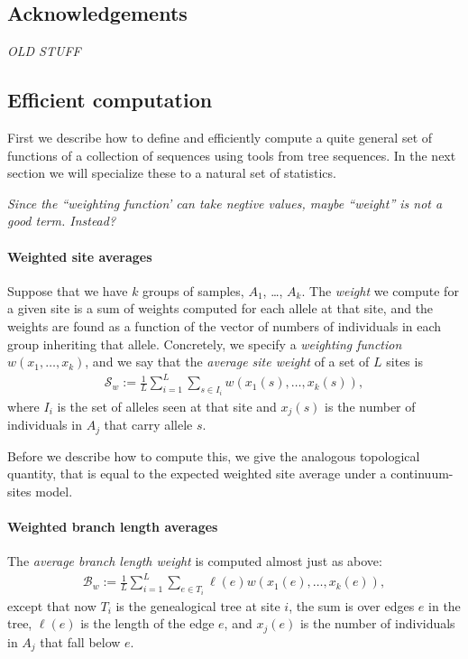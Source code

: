 \documentclass{article}
\newcommand{\branch}{\mathcal{B}} %
\newcommand{\site}{\mathcal{S}} %
\newcommand{\plr}[1]{{\color{blue} \it #1}}
\begin{document}
\subsection*{Acknowledgements}




\newpage
\appendix

{\Large \plr{OLD STUFF}}

\subsection*{Efficient computation}

First we describe how to define
and efficiently compute a quite general set of functions of a collection of sequences
using tools from tree sequences.
In the next section we will specialize these to a natural set of statistics.

\plr{Since the ``weighting function' can take negtive values, maybe ``weight'' is not a good term.  Instead?}

\paragraph{Weighted site averages}
Suppose that we have $k$ groups of samples, $A_1$, \ldots, $A_k$.
The \emph{weight} we compute for a given site is a sum of weights computed for each allele at that site,
and the weights are found as a function of the vector of numbers of individuals in each group inheriting that allele.
Concretely, we specify a \emph{weighting function} $w(x_1, \ldots, x_k)$,
and we say that the \emph{average site weight} of a set of $L$ sites is
\begin{align} \label{eqn:average_site_weight}
    \site_w := \frac{1}{L} \sum_{i=1}^L \sum_{s \in I_i} w(x_1(s), \ldots, x_k(s)) ,
\end{align}
where $I_i$ is the set of alleles seen at that site and
$x_j(s)$ is the number of individuals in $A_j$ that carry allele $s$.

Before we describe how to compute this,
we give the analogous topological quantity,
that is equal to the expected weighted site average
under a continuum-sites model.

\paragraph{Weighted branch length averages}
The \emph{average branch length weight}
is computed almost just as above:
\begin{align} \label{eqn:average_branch_weight}
    \branch_w :=  \frac{1}{L} \sum_{i=1}^L \sum_{e \in T_i} \ell(e) w(x_1(e), \ldots, x_k(e)) ,
\end{align}
except that now $T_i$ is the genealogical tree at site $i$,
the sum is over edges $e$ in the tree, $\ell(e)$ is the length of the edge $e$,
and $x_j(e)$ is the number of individuals in $A_j$ that fall below $e$.
\end{document}
